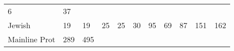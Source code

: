 \documentclass[]{article}
\begin{document}
\begin{longtable}[]{@{}lllllllllll@{}}
\begin{minipage}[t]{0.04\columnwidth}
6\strut
\end{minipage} & \begin{minipage}[t]{0.11\columnwidth}\raggedright\strut
37\strut
\end{minipage}\tabularnewline
\begin{minipage}[t]{0.14\columnwidth}\raggedright\strut
Jewish\strut
\end{minipage} & \begin{minipage}[t]{0.04\columnwidth}\raggedright\strut
19\strut
\end{minipage} & \begin{minipage}[t]{0.05\columnwidth}\raggedright\strut
19\strut
\end{minipage} & \begin{minipage}[t]{0.05\columnwidth}\raggedright\strut
25\strut
\end{minipage} & \begin{minipage}[t]{0.05\columnwidth}\raggedright\strut
25\strut
\end{minipage} & \begin{minipage}[t]{0.05\columnwidth}\raggedright\strut
30\strut
\end{minipage} & \begin{minipage}[t]{0.05\columnwidth}\raggedright\strut
95\strut
\end{minipage} & \begin{minipage}[t]{0.06\columnwidth}\raggedright\strut
69\strut
\end{minipage} & \begin{minipage}[t]{0.06\columnwidth}\raggedright\strut
87\strut
\end{minipage} & \begin{minipage}[t]{0.04\columnwidth}\raggedright\strut
151\strut
\end{minipage} & \begin{minipage}[t]{0.11\columnwidth}\raggedright\strut
162\strut
\end{minipage}\tabularnewline
\begin{minipage}[t]{0.14\columnwidth}\raggedright\strut
Mainline Prot\strut
\end{minipage} & \begin{minipage}[t]{0.04\columnwidth}\raggedright\strut
289\strut
\end{minipage} & \begin{minipage}[t]{0.05\columnwidth}\raggedright\strut
495\strut
\end{minipage} & \begin{minipage}[t]{0.05\columnwidth}\raggedright\strut

\end{minipage}
\end{longtable}
\end{document}
